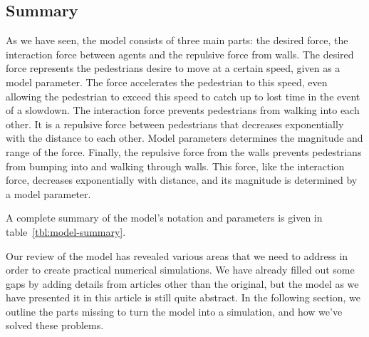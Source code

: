 \subsection{Summary}
As we have seen, the model consists of three main parts: the desired force, 
the interaction force between agents and the repulsive force from walls. The 
desired force represents the pedestrians desire to move at a certain speed, 
given as a model parameter. The force accelerates the pedestrian to this 
speed, even allowing the pedestrian to exceed this speed to catch up to lost 
time in the event of a slowdown. The interaction force prevents pedestrians 
from walking into each other. It is a repulsive force between pedestrians that 
decreases exponentially with the distance to each other. Model parameters 
determines the magnitude and range of the force. Finally, the repulsive force 
from the walls prevents pedestrians from bumping into and walking through 
walls. This force, like the interaction force, decreases exponentially with 
distance, and its magnitude is determined by a model parameter.

A complete summary of the model's notation and parameters is given in 
table~\ref{tbl:model-summary}.

Our review of the model has revealed various areas that we need to address in 
order to create practical numerical simulations. We have already filled out 
some gaps by adding details from articles other than the original, but the 
model as we have presented it in this article is still quite abstract. In the 
following section, we outline the parts missing to turn the model into a 
simulation, and how we've solved these problems.


